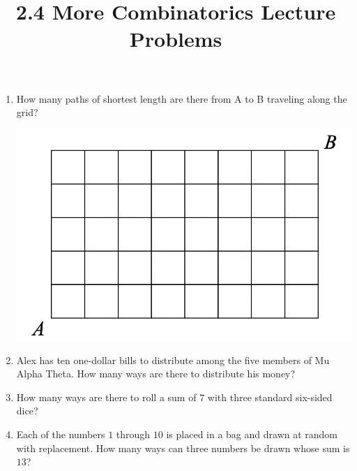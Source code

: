 \documentclass{article}
\title{2.4 More Combinatorics Lecture Problems}
\author{}
\date{}
\begin{document}
\maketitle

\begin{enumerate}
    \item How many paths of shortest length are there from A to B traveling along the grid?
    \begin{center}
        \includegraphics[scale=0.5]{paths.png}
    \end{center}
        \vspace{3cm}
    \item Alex has ten one-dollar bills to distribute among the five members of 
		Mu Alpha Theta. How many ways are there to distribute his money?
		\vspace{3cm}
	\item How many ways are there to roll a sum of $7$ with three standard 
		six-sided dice?
		\vspace{3cm}
	\item Each of the numbers $1$ through $10$ is placed in a bag and drawn at 
		random with replacement. How many ways can three numbers be drawn whose 
		sum is $13$?
		\vspace{3cm}
\end{enumerate}
\end{document}
